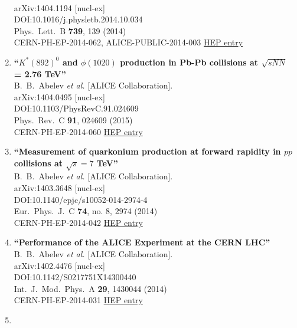 \begin{enumerate}
  \\{}arXiv:1404.1194 [nucl-ex]
  \\{}DOI:10.1016/j.physletb.2014.10.034
  \\{}Phys.\ Lett.\ B {\bf 739}, 139 (2014)
  \\{}CERN-PH-EP-2014-062, ALICE-PUBLIC-2014-003
\href{http://inspirehep.net/record/1288705}{HEP entry}
\item%
{\bf ``$K^*(892)^0$ and $ϕ(1020)$ production in Pb-Pb collisions at $\sqrt{s{NN}}$ = 2.76 TeV''}
  \\{}B.~B.~Abelev {\it et al.} [ALICE Collaboration].
  \\{}arXiv:1404.0495 [nucl-ex]
  \\{}DOI:10.1103/PhysRevC.91.024609
  \\{}Phys.\ Rev.\ C {\bf 91}, 024609 (2015)
  \\{}CERN-PH-EP-2014-060
\href{http://inspirehep.net/record/1288320}{HEP entry}
\item%
{\bf ``Measurement of quarkonium production at forward rapidity in $pp$ collisions at $\sqrt{s} = 7$ TeV''}
  \\{}B.~B.~Abelev {\it et al.} [ALICE Collaboration].
  \\{}arXiv:1403.3648 [nucl-ex]
  \\{}DOI:10.1140/epjc/s10052-014-2974-4
  \\{}Eur.\ Phys.\ J.\ C {\bf 74}, no. 8, 2974 (2014)
  \\{}CERN-PH-EP-2014-042
\href{http://inspirehep.net/record/1285950}{HEP entry}
\item%
{\bf ``Performance of the ALICE Experiment at the CERN LHC''}
  \\{}B.~B.~Abelev {\it et al.} [ALICE Collaboration].
  \\{}arXiv:1402.4476 [nucl-ex]
  \\{}DOI:10.1142/S0217751X14300440
  \\{}Int.\ J.\ Mod.\ Phys.\ A {\bf 29}, 1430044 (2014)
  \\{}CERN-PH-EP-2014-031
\href{http://inspirehep.net/record/1281831}{HEP entry}
\item%

\end{enumerate}
